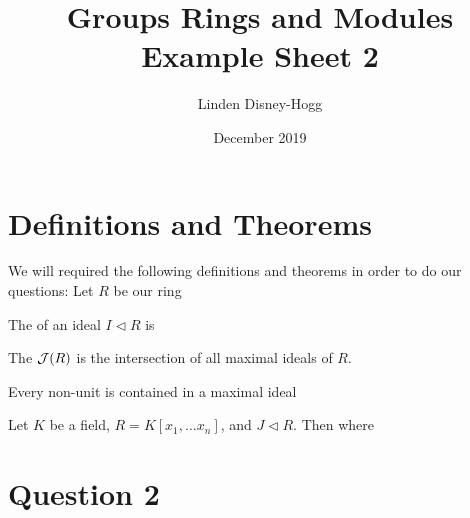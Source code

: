 \documentclass{article}
\title{Groups Rings and Modules Example Sheet 2}
\author{Linden Disney-Hogg}
\date{December 2019}
\begin{document}
\maketitle
\tableofcontents

\section{Definitions and Theorems}
We will required the following definitions and theorems in order to do our questions: Let $R$ be our ring

\begin{definition}
The  of an ideal $I \vartriangleleft R$ is 
\end{definition}

\begin{definition}
The  $\mathcal{J}(R)$ is the intersection of all maximal ideals of $R$. 
\end{definition}

\begin{theorem}
Every non-unit is contained in a maximal ideal
\end{theorem}

\begin{theorem}[Nullstellensatz]
Let $K$ be a field, $R = K[x_1, \dots x_n]$, and $J \vartriangleleft R$. Then 
where
\end{theorem}
\section{Question 2}
\end{document}
